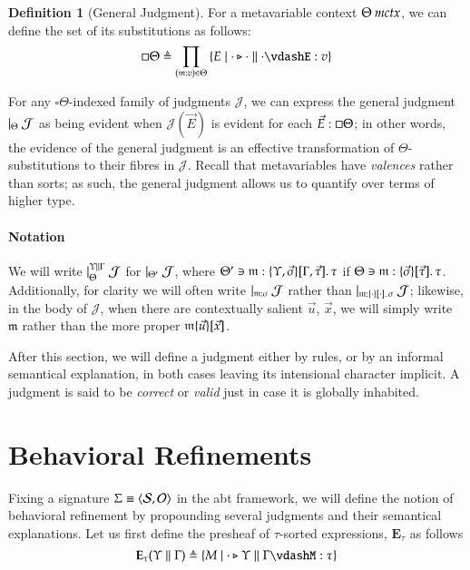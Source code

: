 \documentclass[11pt]{article}
\theoremstyle{definition}
\newtheorem{definition}[thm]{Definition}
\theoremstyle{remark}
\numberwithin{equation}{section}
\def\IModeColorName{MidnightBlue}
\def\OModeColorName{Maroon}
\def\IModeColorName{Black}
\def\OModeColorName{Black}
\newcommand\IMode[1]{{\color{\IModeColorName}{#1}}}
\newcommand\OMode[1]{{\color{\OModeColorName}{#1}}}
\newcommand\GenJ[2]{\vert_{\IMode{#1}}\; #2}
\newcommand\HPGenJ[4]{\vert^{\IMode{#1}\parallel\IMode{#2}}_{\IMode{#3}}\; #4}
\newcommand\MkSet[1]{\left\{#1\right\}}
\newcommand\Of[2]{\IMode{#1}: \IMode{#2}}
\newcommand\MkValence[3]{%
  \ifthenelse{\equal{#1}{}}{}{%
    \{#1\}%
  }%
  \ifthenelse{\equal{#2}{}}{}{%
    [#2]%
  }.\, #3%
}
\newcommand\Match[2]{\IMode{#1}\equiv\OMode{#2}}
\newcommand\Sorts{\mathcal{S}}
\newcommand\Operators{\mathcal{O}}
\newcommand\IsMetaCtx[1]{\IMode{#1}\ \textit{mctx}}
\newcommand\Lookup[3]{\IMode{#1}\ni\IMode{#2}:\OMode{#3}}
\newcommand\Pair[2]{\left\langle#1, #2 \right\rangle}
\newcommand\IsAbtUnmoded[5]{
  #1\triangleright%
  #2\parallel%
  #3\vdash%
  #4:\OMode{#5}%
}
\newcommand\MV[1]{\mathfrak{#1}}
\newcommand\MApp[3]{%
  #1
  \ifthenelse{\equal{#2}{}}{}{%
    \{#2\}%
  }%
  \ifthenelse{\equal{#3}{}}{}{%
    [#3]%
  }
}
\newcommand\Define[2]{\IMode{#1}\triangleq\OMode{#2}}
\newcommand\Exprs{\mathbf{E}}
\begin{document}
\begin{definition}[General Judgment]
  For a metavariable context $\IsMetaCtx{\Theta}$, we can define the set
  of its substitutions as follows:
  \[
    \Define{{\square\Theta}}{
      \prod_{(\MV{m}:v)\in\Theta}
        \MkSet{E\mid\IsAbtUnmoded{\cdot}{\cdot}{\cdot}{E}{v}}
    }
  \]

  For any $\square{\Theta}$-indexed family of judgments $\mathcal{J}$, we can
  express the general judgment $\GenJ{\Theta}{\mathcal{J}}$ as being evident
  when $\mathcal{J}(\vec{E})$ is evident for each
  $\Of{\vec{E}}{\square\Theta}$; in other words, the evidence of the general
  judgment is an effective transformation of $\Theta$-substitutions to their
  fibres in $\mathcal{J}$.  Recall that metavariables have \emph{valences}
  rather than sorts; as such, the general judgment allows us to quantify over
  terms of higher type.

   \paragraph{Notation}

   We will write $\HPGenJ{\Upsilon}{\Gamma}{\Theta}{\mathcal{J}}$ for
   $\GenJ{\Theta'}{\mathcal{J}}$, where
   $\Lookup{\Theta'}{\MV{m}}{\MkValence{\Upsilon,\vec{\sigma}}{\Gamma,\vec{\tau}}{\tau}}$
   if $\Lookup{\Theta}{\MV{m}}{\MkValence{\vec{\sigma}}{\vec{\tau}}{\tau}}$.
   Additionally, for clarity we will often write
   $\GenJ{\MV{m}:\sigma}{\mathcal{J}}$ rather than
   $\GenJ{\MV{m}:\MkValence{\cdot}{\cdot}{\sigma}}{\mathcal{J}}$; likewise, in
   the body of $\mathcal{J}$, when there are contextually salient
   $\vec{u}$, $\vec{x}$, we will simply write $\MV{m}$ rather than the more proper
   $\MApp{\MV{m}}{\vec{u}}{\vec{x}}$.

\end{definition}

After this section, we will define a judgment either by rules, or by an
informal semantical explanation, in both cases leaving its intensional
character implicit. A judgment is said to be \emph{correct} or \emph{valid}
just in case it is globally inhabited.

\section{Behavioral Refinements}

Fixing a signature $\Match{\Sigma}{\Pair{\Sorts}{\Operators}}$ in the abt
framework, we will define the notion of behavioral refinement by propounding
several judgments and their semantical explanations. Let us first define the
presheaf of $\tau$-sorted expressions, $\Exprs_\tau$ as follows
\[
  \Define{
    \Exprs_\tau(\Upsilon\parallel\Gamma)
  }{
    \MkSet{M \mid \IsAbtUnmoded{\cdot}{\Upsilon}{\Gamma}{M}{\tau}}
  }
\]
\end{document}
